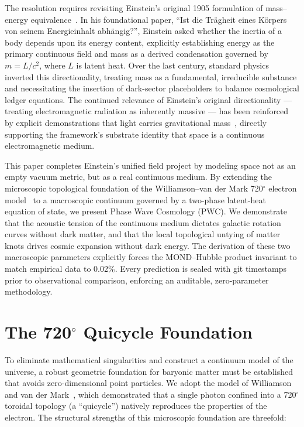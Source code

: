 \documentclass[aps,prd,twocolumn,superscriptaddress,amsmath,amssymb,nofootinbib,floatfix]{revtex4-2}
\begin{document}
The resolution requires revisiting Einstein's original 1905 formulation of mass--energy equivalence~\cite{Einstein1905}. In his foundational paper, ``Ist die Tr\"agheit eines K\"orpers von seinem Energieinhalt abh\"angig?'', Einstein asked whether the inertia of a body depends upon its energy content, explicitly establishing energy as the primary continuous field and mass as a derived condensation governed by $m = L/c^2$, where $L$ is latent heat. Over the last century, standard physics inverted this directionality, treating mass as a fundamental, irreducible substance and necessitating the insertion of dark-sector placeholders to balance cosmological ledger equations. The continued relevance of Einstein's original directionality --- treating electromagnetic radiation as inherently massive --- has been reinforced by explicit demonstrations that light carries gravitational mass~\cite{LightIsHeavy}, directly supporting the framework's substrate identity that space is a continuous electromagnetic medium.

This paper completes Einstein's unified field project by modeling space not as an empty vacuum metric, but as a real continuous medium. By extending the microscopic topological foundation of the Williamson--van der Mark 720$^{\circ}$ electron model~\cite{WilliamsonVanDerMark1997} to a macroscopic continuum governed by a two-phase latent-heat equation of state, we present Phase Wave Cosmology (PWC). We demonstrate that the acoustic tension of the continuous medium dictates galactic rotation curves without dark matter, and that the local topological untying of matter knots drives cosmic expansion without dark energy. The derivation of these two macroscopic parameters explicitly forces the MOND--Hubble product invariant to match empirical data to 0.02\%. Every prediction is sealed with git timestamps prior to observational comparison, enforcing an auditable, zero-parameter methodology.

\section{The 720$^{\circ}$ Quicycle Foundation}
\label{sec:quicycle}

To eliminate mathematical singularities and construct a continuum model of the universe, a robust geometric foundation for baryonic matter must be established that avoids zero-dimensional point particles. We adopt the model of Williamson and van der Mark~\cite{WilliamsonVanDerMark1997}, which demonstrated that a single photon confined into a 720$^{\circ}$ toroidal topology (a ``quicycle'') natively reproduces the properties of the electron. The structural strengths of this microscopic foundation are threefold:
\end{document}
